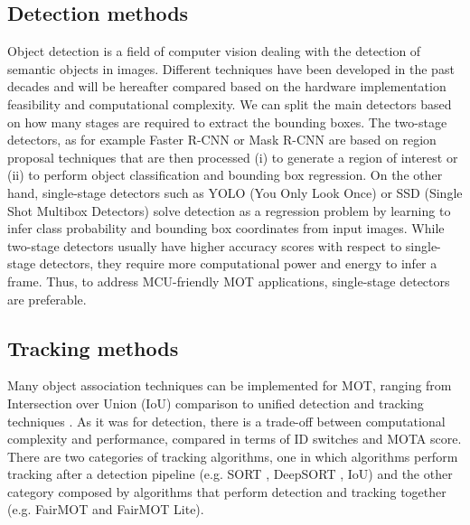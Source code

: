 \subsection{Detection methods}
Object detection is a field of computer vision dealing with the detection of semantic objects in images. Different techniques have been developed in the past decades and will be hereafter compared based on the hardware implementation feasibility and computational complexity.
We can split the main detectors based on how many stages are required to extract the bounding boxes. The two-stage detectors, as for example Faster R-CNN \cite{ren2015faster} or Mask R-CNN \cite{he2017mask} are based on region proposal techniques that are then processed (i) to generate a region of interest or (ii) to perform object classification and bounding box regression. On the other hand, single-stage detectors such as YOLO (You Only Look Once) \cite{redmon2017yolo9000} or SSD (Single Shot Multibox Detectors) \cite{liu2016ssd} solve detection as a regression problem by learning to infer class probability and bounding box coordinates from input images. While two-stage detectors usually have higher accuracy scores with respect to single-stage detectors, they require more computational power and energy to infer a frame. Thus, to address MCU-friendly MOT applications, single-stage detectors are preferable. %


\subsection{Tracking methods}

Many object association techniques can be implemented for MOT, ranging from Intersection over Union (IoU) comparison to unified detection and tracking techniques \cite{zhang2020fairmot}. As it was for detection, there is a trade-off between computational complexity and performance, compared in terms of ID switches and MOTA score.
There are two categories of tracking algorithms, one in which algorithms perform tracking after a detection pipeline (e.g. SORT \cite{bewley2016simple}, DeepSORT \cite{wojke2017simple}, IoU) and the other category composed by algorithms that perform detection and tracking together (e.g. FairMOT \cite{zhang2020fairmot} and FairMOT Lite).

